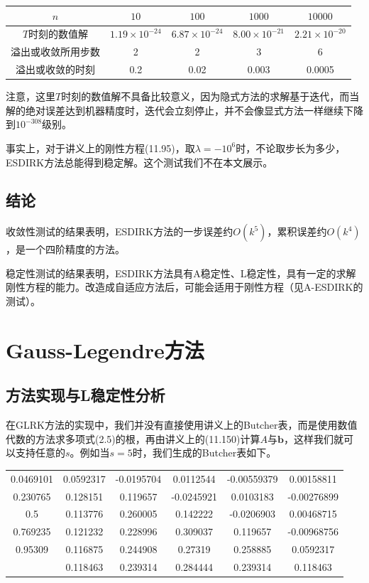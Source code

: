 \documentclass[lang=cn,10pt,bibend=bibtex]{elegantbook}
\begin{document}
\begin{table}[htbp]
  \centering
  \renewcommand\arraystretch{1.1}
  \begin{tabular}{c|cccc}
    $n$ & $10$ & $100$ & $1000$ & $10000$\\ \hline
    $T$时刻的数值解 & $1.19\times 10^{-24}$ & $6.87\times 10^{-24}$ & $8.00\times 10^{-21}$ & $2.21\times 10^{-20}$\\
    溢出或收敛所用步数 & 2 & 2 & 3 & 6\\
    溢出或收敛的时刻 & 0.2 & 0.02 & 0.003 & 0.0005
  \end{tabular}
\end{table}

注意，这里$T$时刻的数值解不具备比较意义，因为隐式方法的求解基于迭代，而当解的绝对误差达到机器精度时，迭代会立刻停止，并不会像显式方法一样继续下降到$10^{-308}$级别。

事实上，对于讲义上的刚性方程(11.95)，取$\lambda=-10^6$时，不论取步长为多少，ESDIRK方法总能得到稳定解。这个测试我们不在本文展示。

\subsection{结论}

收敛性测试的结果表明，ESDIRK方法的一步误差约$O(k^5)$，累积误差约$O(k^4)$，是一个四阶精度的方法。

稳定性测试的结果表明，ESDIRK方法具有A稳定性、L稳定性，具有一定的求解刚性方程的能力。改造成自适应方法后，可能会适用于刚性方程（见A-ESDIRK的测试）。

\vspace{-1.5em}
\section{Gauss-Legendre方法}
\vspace{-.5em}

\subsection{方法实现与L稳定性分析}

在GLRK方法的实现中，我们并没有直接使用讲义上的Butcher表，而是使用数值代数的方法求多项式(2.5)的根，再由讲义上的(11.150)计算$A$与$\mathbf{b}$，这样我们就可以支持任意的$s$。例如当$s=5$时，我们生成的Butcher表如下。

\begin{table}[htbp]
  \centering
  \begin{tabular}{c|ccccc}
    0.0469101 & 0.0592317 & -0.0195704 & 0.0112544 & -0.00559379 & 0.00158811\\
    0.230765 & 0.128151 & 0.119657 & -0.0245921 & 0.0103183 & -0.00276899\\
    0.5 & 0.113776 & 0.260005 & 0.142222 & -0.0206903 & 0.00468715\\
    0.769235 & 0.121232 & 0.228996 & 0.309037 & 0.119657 & -0.00968756\\
    0.95309  & 0.116875 & 0.244908 & 0.27319 & 0.258885 & 0.0592317\\ \hline
     & 0.118463 & 0.239314 & 0.284444 & 0.239314 & 0.118463
  \end{tabular}
\end{table}
\end{document}
